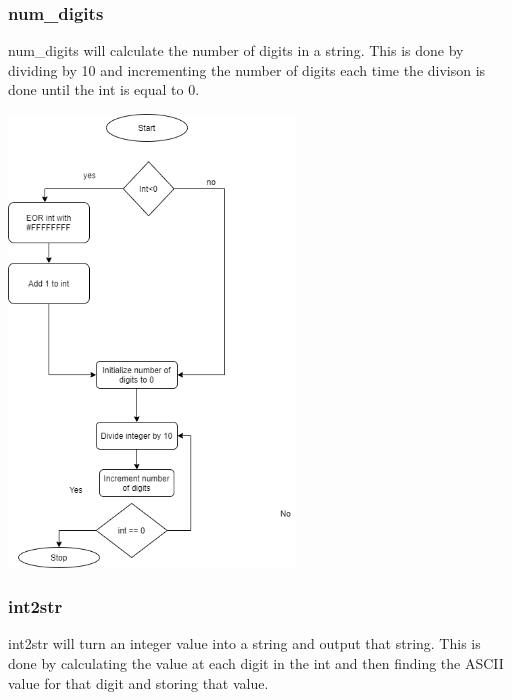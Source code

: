 \documentclass{article}
\begin{document}
    \newpage
    \subsubsection{num\_digits}
        num\_digits will calculate the number of digits in a string. This is done by
        dividing by 10 and incrementing the number of digits each time the divison is done until
        the int is equal to 0.

        \begin{center}
            {\includegraphics[height=12cm]{num_digits.png}\centering} 
        \end{center}

    \newpage
    \subsubsection{int2str}
        int2str will turn an integer value into a string and output that string. This is done by
        calculating the value at each digit in the int and then finding the ASCII value for that digit
        and storing that value. 
\end{document}
